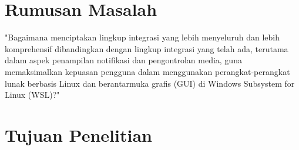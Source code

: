 \section{Rumusan Masalah}

"Bagaimana menciptakan lingkup integrasi yang lebih menyeluruh dan lebih komprehensif dibandingkan dengan lingkup integrasi yang telah ada, terutama dalam aspek penampilan notifikasi dan pengontrolan media, guna memaksimalkan kepuasan pengguna dalam menggunakan perangkat-perangkat lunak berbasis Linux dan berantarmuka grafis (GUI) di Windows Subsystem for Linux (WSL)?"


\section{Tujuan Penelitian}


